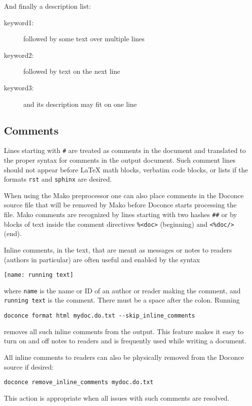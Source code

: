 \documentclass[%
oneside,                 %
final,                   %
10pt]{article}
\begin{document}
\noindent
And finally a description list:

\begin{description}
 \item[keyword1:] 
   followed by
   some text
   over multiple
   lines

 \item[keyword2:] 
   followed by text on the next line

 \item[keyword3:] 
   and its description may fit on one line
\end{description}

\noindent

\subsection{Comments}

Lines starting with \Verb!#! are treated as comments in the document and
translated to the proper syntax for comments in the output
document. Such comment lines should not appear before {\LaTeX} math
blocks, verbatim code blocks, or lists if the formats \Verb!rst! and
\Verb!sphinx! are desired.

When using the Mako preprocessor one can also place comments in
the Doconce source file that will be removed by Mako before
Doconce starts processing the file. Mako comments are recognized
by lines starting with two hashes \Verb!##! or by blocks of text
inside the comment directives \Verb!%

Inline comments, in the text, that are meant as messages or notes to readers
(authors in particular)
are often useful and enabled by the syntax
\begin{Verbatim}[numbers=none,fontsize=\fontsize{9pt}{9pt},baselinestretch=0.85,xleftmargin=0mm]
[name: running text]
\end{Verbatim}
where \Verb!name! is the name or ID of an author or reader making the comment,
and \Verb!running text! is the comment. There must be a space after the colon.
Running
\begin{Verbatim}[numbers=none,fontsize=\fontsize{9pt}{9pt},baselinestretch=0.85,xleftmargin=0mm]
doconce format html mydoc.do.txt --skip_inline_comments
\end{Verbatim}
removes all such inline comments from the output. This feature makes it easy
to turn on and off notes to readers and is frequently used while writing
a document.

All inline comments to readers can also be physically
removed from the Doconce source if desired:
\begin{Verbatim}[numbers=none,fontsize=\fontsize{9pt}{9pt},baselinestretch=0.85,xleftmargin=0mm]
doconce remove_inline_comments mydoc.do.txt
\end{Verbatim}
This action is appropriate when all issues with such comments are resolved.
\end{document}
